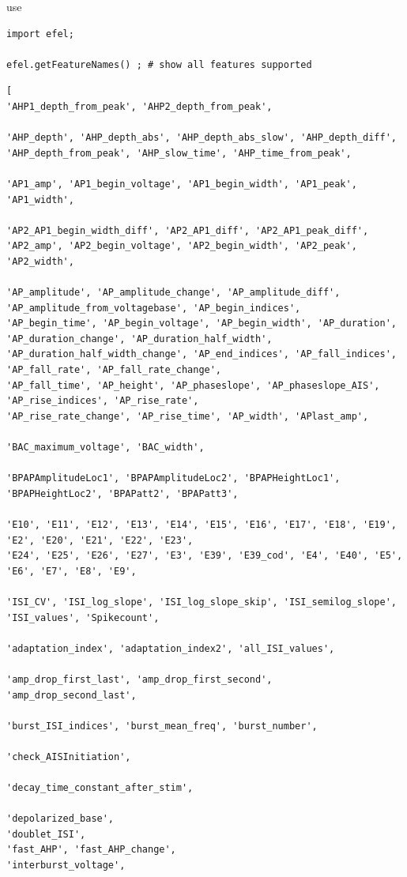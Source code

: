 use
\begin{lstlisting}
import efel;

efel.getFeatureNames() ; # show all features supported
\end{lstlisting}

{\tiny
\begin{verbatim}
[
'AHP1_depth_from_peak', 'AHP2_depth_from_peak',

'AHP_depth', 'AHP_depth_abs', 'AHP_depth_abs_slow', 'AHP_depth_diff', 'AHP_depth_from_peak', 'AHP_slow_time', 'AHP_time_from_peak',

'AP1_amp', 'AP1_begin_voltage', 'AP1_begin_width', 'AP1_peak', 'AP1_width',

'AP2_AP1_begin_width_diff', 'AP2_AP1_diff', 'AP2_AP1_peak_diff', 'AP2_amp', 'AP2_begin_voltage', 'AP2_begin_width', 'AP2_peak', 'AP2_width',

'AP_amplitude', 'AP_amplitude_change', 'AP_amplitude_diff', 'AP_amplitude_from_voltagebase', 'AP_begin_indices', 
'AP_begin_time', 'AP_begin_voltage', 'AP_begin_width', 'AP_duration', 'AP_duration_change', 'AP_duration_half_width', 
'AP_duration_half_width_change', 'AP_end_indices', 'AP_fall_indices', 'AP_fall_rate', 'AP_fall_rate_change', 
'AP_fall_time', 'AP_height', 'AP_phaseslope', 'AP_phaseslope_AIS', 'AP_rise_indices', 'AP_rise_rate', 
'AP_rise_rate_change', 'AP_rise_time', 'AP_width', 'APlast_amp',

'BAC_maximum_voltage', 'BAC_width',

'BPAPAmplitudeLoc1', 'BPAPAmplitudeLoc2', 'BPAPHeightLoc1', 'BPAPHeightLoc2', 'BPAPatt2', 'BPAPatt3',

'E10', 'E11', 'E12', 'E13', 'E14', 'E15', 'E16', 'E17', 'E18', 'E19', 'E2', 'E20', 'E21', 'E22', 'E23', 
'E24', 'E25', 'E26', 'E27', 'E3', 'E39', 'E39_cod', 'E4', 'E40', 'E5', 'E6', 'E7', 'E8', 'E9',

'ISI_CV', 'ISI_log_slope', 'ISI_log_slope_skip', 'ISI_semilog_slope', 'ISI_values', 'Spikecount',

'adaptation_index', 'adaptation_index2', 'all_ISI_values',

'amp_drop_first_last', 'amp_drop_first_second', 'amp_drop_second_last',

'burst_ISI_indices', 'burst_mean_freq', 'burst_number',

'check_AISInitiation',

'decay_time_constant_after_stim',

'depolarized_base',
'doublet_ISI',
'fast_AHP', 'fast_AHP_change',
'interburst_voltage',


\end{verbatim}}

